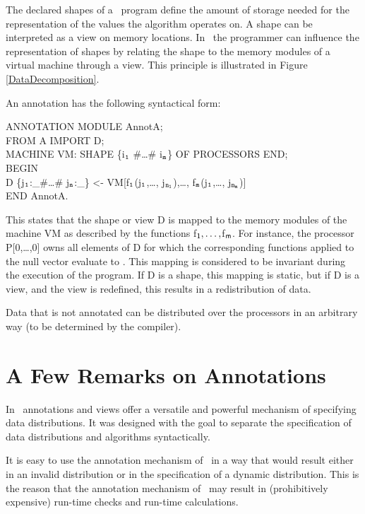 The declared shapes of a \Booster\ program define the amount of
storage needed for the representation of the values the algorithm
operates on. A shape can be interpreted as a view on memory
locations. In \Booster\ the programmer can influence the
representation of shapes by relating the shape to the memory modules
of a virtual machine through a view. This principle is illustrated in
Figure \ref{DataDecomposition}.

An annotation has the following syntactical form:

\begin{frag}
ANNOTATION MODULE AnnotA;\\
\hlf
FROM A IMPORT D;\\
\hlf
MACHINE VM: SHAPE \{i$_{\tt 1}$ \#\ldots\# i$_{\tt m}$\} OF PROCESSORS END;\\
\hlf
BEGIN\\
\>  D \{j$_{\tt 1}$:\_\#\ldots\# j$_{\tt n}$:\_\} <- 
    VM[f$_{\tt 1}$(j$_{\tt 1}$,\ldots, j$_{\tt n_{\tt 1}}$),\ldots ,
       f$_{\tt m}$(j$_{\tt 1}$,\ldots, j$_{\tt n_{\tt m}}$)]\\
END AnnotA.
\end{frag}

This states that the shape or view {\sf D} is mapped to the memory
modules of the machine {\sf VM} as described by the functions {\sf
f}$_{\sf 1},\ldots,${\sf f}$_{\sf m}$. For instance, the processor
{\sf P[0,\ldots,0]} owns all elements of {\sf D} for which the
corresponding functions applied to the null vector evaluate to {}. This mapping is considered to be invariant during the execution
of the program. If {\sf D} is a shape, this mapping is static, but if
{\sf D} is a view, and the view is redefined, this results in a
redistribution of data.

Data that is not annotated can be distributed over the processors in
an arbitrary way (to be determined by the compiler).

\section{A Few Remarks on Annotations}

In \Booster\ annotations and views offer a versatile and powerful
mechanism of specifying data distributions. It was designed with the
goal to separate the specification of data distributions and
algorithms syntactically. 

It is easy to use the annotation mechanism of \Booster\ in a way that
would result either in an invalid distribution or in the specification
of a dynamic distribution. This is the reason that the annotation
mechanism of \Booster\ may result in (prohibitively expensive)
run-time checks and run-time calculations.

